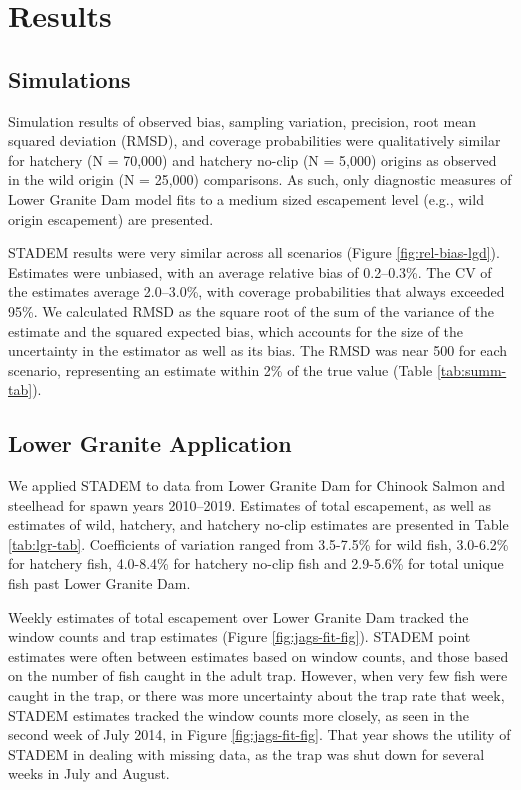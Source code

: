 \documentclass[
  12pt,
]{article}
\begin{document}
\hypertarget{results}{%
\section{Results}\label{results}}

\hypertarget{simulations-1}{%
\subsection{Simulations}\label{simulations-1}}

Simulation results of observed bias, sampling variation, precision, root mean squared deviation (RMSD), and coverage probabilities were qualitatively similar for hatchery (N = 70,000) and hatchery no-clip (N = 5,000) origins as observed in the wild origin (N = 25,000) comparisons. As such, only diagnostic measures of Lower Granite Dam model fits to a medium sized escapement level (e.g., wild origin escapement) are presented.

STADEM results were very similar across all scenarios (Figure \ref{fig:rel-bias-lgd}). Estimates were unbiased, with an average relative bias of 0.2--0.3\%. The CV of the estimates average 2.0--3.0\%, with coverage probabilities that always exceeded 95\%. We calculated RMSD as the square root of the sum of the variance of the estimate and the squared expected bias, which accounts for the size of the uncertainty in the estimator as well as its bias. The RMSD was near 500 for each scenario, representing an estimate within 2\% of the true value (Table \ref{tab:summ-tab}).

\hypertarget{lower-granite-application-1}{%
\subsection{Lower Granite Application}\label{lower-granite-application-1}}

We applied STADEM to data from Lower Granite Dam for Chinook Salmon and steelhead for spawn years 2010--2019. Estimates of total escapement, as well as estimates of wild, hatchery, and hatchery no-clip estimates are presented in Table \ref{tab:lgr-tab}. Coefficients of variation ranged from 3.5-7.5\% for wild fish, 3.0-6.2\% for hatchery fish, 4.0-8.4\% for hatchery no-clip fish and 2.9-5.6\% for total unique fish past Lower Granite Dam.

Weekly estimates of total escapement over Lower Granite Dam tracked the window counts and trap estimates (Figure \ref{fig:jags-fit-fig}). STADEM point estimates were often between estimates based on window counts, and those based on the number of fish caught in the adult trap. However, when very few fish were caught in the trap, or there was more uncertainty about the trap rate that week, STADEM estimates tracked the window counts more closely, as seen in the second week of July 2014, in Figure \ref{fig:jags-fit-fig}. That year shows the utility of STADEM in dealing with missing data, as the trap was shut down for several weeks in July and August.
\end{document}
